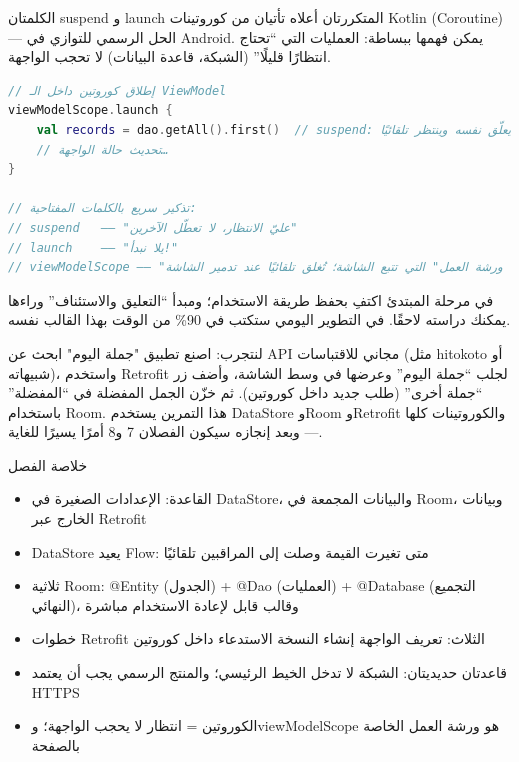 
الكلمتان suspend و launch المتكررتان أعلاه تأتيان من كوروتينات Kotlin (Coroutine) — الحل الرسمي للتوازي في Android. يمكن فهمها ببساطة: العمليات التي “تحتاج انتظارًا قليلًا” (الشبكة، قاعدة البيانات) لا تحجب الواجهة.

\begin{lstlisting}[language=Kotlin]
// إطلاق كوروتين داخل الـ ViewModel
viewModelScope.launch {
    val records = dao.getAll().first()  // suspend: يعلّق نفسه وينتظر تلقائيًا
    // تحديث حالة الواجهة…
}

// تذكير سريع بالكلمات المفتاحية:
// suspend   —— "عليّ الانتظار، لا تعطّل الآخرين"
// launch    —— "يلا نبدأ!"
// viewModelScope —— "ورشة العمل" التي تتبع الشاشة؛ تُغلق تلقائيًا عند تدمير الشاشة
\end{lstlisting}

في مرحلة المبتدئ اكتفِ بحفظ طريقة الاستخدام؛ ومبدأ “التعليق والاستئناف” وراءها يمكنك دراسته لاحقًا. في التطوير اليومي ستكتب في 90\% من الوقت بهذا القالب نفسه.

\begin{tcbpractice}{لنتجرب: اصنع تطبيق "جملة اليوم"}
ابحث عن API مجاني للاقتباسات (مثل hitokoto أو شبيهاته)، واستخدم Retrofit لجلب “جملة اليوم” وعرضها في وسط الشاشة، وأضف زر “جملة أخرى” (طلب جديد داخل كوروتين). ثم خزّن الجمل المفضلة في “المفضلة” باستخدام Room. هذا التمرين يستخدم DataStore وRoom وRetrofit والكوروتينات كلها — وبعد إنجازه سيكون الفصلان 7 و8 أمرًا يسيرًا للغاية.

\end{tcbpractice}

\begin{tcbsummary}{خلاصة الفصل}
\begin{itemize}
  \item القاعدة: الإعدادات الصغيرة في DataStore، والبيانات المجمعة في Room، وبيانات الخارج عبر Retrofit
  \item DataStore يعيد Flow: متى تغيرت القيمة وصلت إلى المراقبين تلقائيًا
  \item ثلاثية Room: @Entity (الجدول) + @Dao (العمليات) + @Database (التجميع النهائي)، وقالب قابل لإعادة الاستخدام مباشرة
  \item خطوات Retrofit الثلاث: تعريف الواجهة إنشاء النسخة الاستدعاء داخل كوروتين
  \item قاعدتان حديديتان: الشبكة لا تدخل الخيط الرئيسي؛ والمنتج الرسمي يجب أن يعتمد HTTPS
  \item الكوروتين = انتظار لا يحجب الواجهة؛ وviewModelScope هو ورشة العمل الخاصة بالصفحة
\end{itemize}

\end{tcbsummary}
